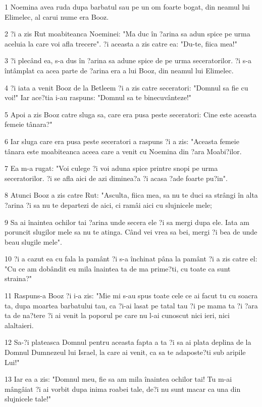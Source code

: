 \par 1 Noemina avea ruda dupa barbatul sau pe un om foarte bogat, din neamul lui Elimelec, al carui nume era Booz.
\par 2 ?i a zis Rut moabiteanca Noeminei: "Ma duc în ?arina sa adun spice pe urma aceluia la care voi afla trecere". ?i aceasta a zis catre ea: "Du-te, fiica mea!"
\par 3 ?i plecând ea, s-a dus în ?arina sa adune spice de pe urma seceratorilor. ?i s-a întâmplat ca acea parte de ?arina era a lui Booz, din neamul lui Elimelec.
\par 4 ?i iata a venit Booz de la Betleem ?i a zis catre seceratori: "Domnul sa fie cu voi!" Iar ace?tia i-au raspuns: "Domnul sa te binecuvânteze!"
\par 5 Apoi a zis Booz catre sluga sa, care era pusa peste seceratori: Cine este aceasta femeie tânara?"
\par 6 Iar sluga care era pusa peste seceratori a raspuns ?i a zis: "Aceasta femeie tânara este moabiteanca aceea care a venit cu Noemina din ?ara Moabi?ilor.
\par 7 Ea m-a rugat: "Voi culege ?i voi aduna spice printre snopi pe urma seceratorilor. ?i se afla aici de azi diminea?a ?i acasa ?ade foarte pu?in".
\par 8 Atunci Booz a zis catre Rut: "Asculta, fiica mea, sa nu te duci sa strângi în alta ?arina ?i sa nu te departezi de aici, ci ramâi aici cu slujnicele mele;
\par 9 Sa ai înaintea ochilor tai ?arina unde secera ele ?i sa mergi dupa ele. Iata am poruncit slugilor mele sa nu te atinga. Când vei vrea sa bei, mergi ?i bea de unde beau slugile mele".
\par 10 ?i a cazut ea cu fala la pamânt ?i s-a închinat pâna la pamânt ?i a zis catre el: "Cu ce am dobândit eu mila înaintea ta de ma prime?ti, cu toate ca sunt straina?"
\par 11 Raspuns-a Booz ?i i-a zis: "Mie mi s-au spus toate cele ce ai facut tu cu soacra ta, dupa moartea barbatului tau, ca ?i-ai lasat pe tatal tau ?i pe mama ta ?i ?ara ta de na?tere ?i ai venit la poporul pe care nu l-ai cunoscut nici ieri, nici alaltaieri.
\par 12 Sa-?i plateasca Domnul pentru aceasta fapta a ta ?i sa ai plata deplina de la Domnul Dumnezeul lui Israel, la care ai venit, ca sa te adaposte?ti sub aripile Lui!"
\par 13 Iar ea a zis: "Domnul meu, fie sa am mila înaintea ochilor tai! Tu m-ai mângâiat ?i ai vorbit dupa inima roabei tale, de?i nu sunt macar ca una din slujnicele tale!"
